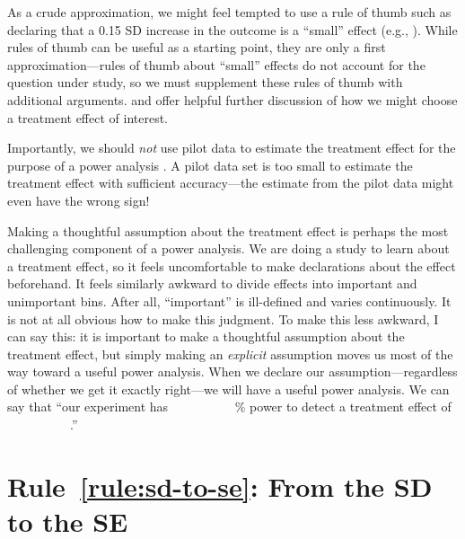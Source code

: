 \documentclass[12pt]{article}
\makeatletter
\def\pr@blank{~~~~~}
\DeclareRobustCommand{\underline}[1]{\def\pr@arg{#1}%
  \ifx\pr@arg\pr@blank\pr@underline{\hbox to 1.3\dimexpr\f@size pt\relax{}}\else\pr@underline{#1}\fi}
\makeatother
\begin{document}
As a crude approximation, we might feel tempted to use a rule of thumb such as declaring that a 0.15 SD increase in the outcome is a ``small'' effect (e.g., \citealt{Lovakov2021}).
While rules of thumb can be useful as a starting point, they are only a first approximation---rules of thumb about ``small'' effects do not account for the question under study, so we must supplement these rules of thumb with additional arguments.
\citet[see esp.~261--263]{Lakens2018} and \citet[see esp.~10--13]{Lakens2022} offer helpful further discussion of how we might choose a treatment effect of interest.

Importantly, we should \textit{not} use pilot data to estimate the treatment effect for the purpose of a power analysis \citep{Leon2011, Albers2018, Rainey2024pilot}.
A pilot data set is too small to estimate the treatment effect with sufficient accuracy---the estimate from the pilot data might even have the wrong sign!

Making a thoughtful assumption about the treatment effect is perhaps the most challenging component of a power analysis.
We are doing a study to learn about a treatment effect, so it feels uncomfortable to make declarations about the effect beforehand.
It feels similarly awkward to divide effects into important and unimportant bins.
After all, ``important'' is ill-defined and varies continuously. It is not at all obvious how to make this judgment.
To make this less awkward, I can say this: it is important to make a thoughtful assumption about the treatment effect, but simply making an \emph{explicit} assumption moves us most of the way toward a useful power analysis.
When we declare our assumption---regardless of whether we get it exactly right---we will have a useful power analysis.
We can say that ``our experiment has \underline{~~~~~}\% power to detect a treatment effect of \underline{~~~~~}.''

\section*{Rule~\ref{rule:sd-to-se}: From the SD to the SE}
\end{document}
